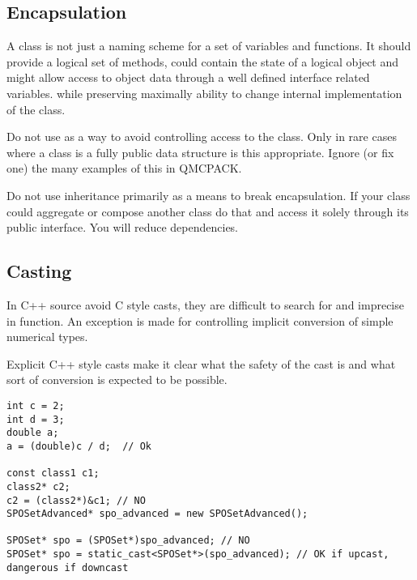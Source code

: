 \subsection{Encapsulation}
A class is not just a naming scheme for a set of variables and functions. It should provide a logical set of methods, could contain the state of a logical object and might allow access to object data through a well defined interface related variables. while preserving maximally ability to change internal implementation of the class.

Do not use  as a way to avoid controlling access to the class. Only in rare cases where a class is a fully public data structure  is this appropriate. Ignore (or fix one) the many examples of this in QMCPACK.

Do not use inheritance primarily as a means to break encapsulation. If your class could aggregate or compose another class do that and access it solely through its public interface. You will reduce dependencies.

\subsection{Casting}
In C++ source avoid C style casts, they are difficult to search for and imprecise in function.
An exception is made for controlling implicit conversion of simple numerical types.

Explicit C++ style casts make it clear what the safety of the cast is and what sort of conversion is expected to be possible.

\begin{lstlisting}
int c = 2;
int d = 3;
double a;
a = (double)c / d;  // Ok

const class1 c1;
class2* c2;
c2 = (class2*)&c1; // NO
SPOSetAdvanced* spo_advanced = new SPOSetAdvanced();

SPOSet* spo = (SPOSet*)spo_advanced; // NO
SPOSet* spo = static_cast<SPOSet*>(spo_advanced); // OK if upcast, dangerous if downcast
\end{lstlisting}

